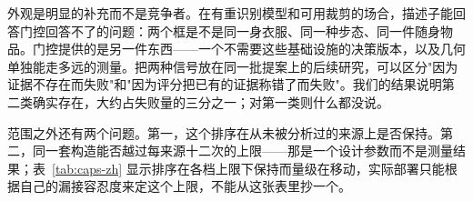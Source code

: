 外观是明显的补充而不是竞争者。在有重识别模型和可用裁剪的场合，描述子能回答门控回答不了的问题：两个框是不是同一身衣服、同一种步态、同一件随身物品。门控提供的是另一件东西——一个不需要这些基础设施的决策版本，以及几何单独能走多远的测量。把两种信号放在同一批提案上的后续研究，可以区分"因为证据不存在而失败"和"因为评分把已有的证据称错了而失败"。我们的结果说明第二类确实存在，大约占失败量的三分之一；对第一类则什么都没说。

范围之外还有两个问题。第一，这个排序在从未被分析过的来源上是否保持。第二，同一套构造能否越过每来源十二次的上限——那是一个设计参数而不是测量结果；表~\ref{tab:caps-zh} 显示排序在各档上限下保持而量级在移动，实际部署只能根据自己的漏接容忍度来定这个上限，不能从这张表里抄一个。
